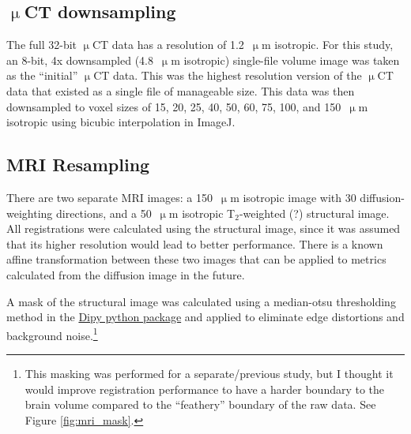 \documentclass[11pt]{article}
\begin{document}
\subsection{$\upmu$CT downsampling}
The full 32-bit $\upmu$CT data has a resolution of 1.2~$\upmu$m isotropic.  For
this study, an 8-bit, 4x downsampled (4.8~$\upmu$m isotropic) single-file volume
image was taken as the ``initial'' $\upmu$CT data. This was the highest
resolution version of the $\upmu$CT data that existed as a single file of
manageable size. This data was then downsampled to voxel sizes of 15, 20, 25,
40, 50, 60, 75, 100, and 150~$\upmu$m isotropic using bicubic interpolation
in ImageJ.

\subsection{MRI Resampling}
There are two separate MRI images: a 150~$\upmu$m isotropic image with 30
diffusion-weighting directions, and a 50~$\upmu$m isotropic T$_2$-weighted (?)
structural image. All registrations were calculated using the structural image,
since it was assumed that its higher resolution would lead to better
performance. There is a known affine transformation between these two images
that can be applied to metrics calculated from the diffusion image in the
future.

A mask of the structural image was calculated using a median-otsu thresholding
method in the
\href{http://nipy.org/dipy/examples_built/brain_extraction_dwi.html#example-brain-extraction-dwi}{Dipy
  python package} \cite{dipy} and applied to eliminate edge distortions and background
noise.\footnote{This masking was performed for a separate/previous study, but I
  thought it would improve registration performance to have a harder boundary to
  the brain volume compared to the ``feathery'' boundary of the raw data. See
  Figure \ref{fig:mri_mask}.}
\end{document}
